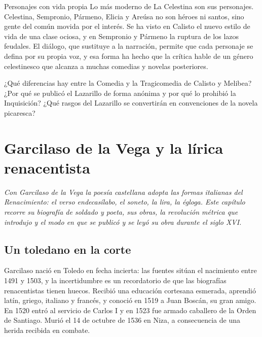\documentclass{book}
\begin{document}
\begin{tcolorbox}[title={Autoficha}, studiumcheck, breakable]

Personajes con vida propia
Lo más moderno de La Celestina son sus personajes. Celestina, Sempronio, Pármeno, Elicia y Areúsa no son héroes ni santos, sino gente del común movida por el interés. Se ha visto en Calisto el nuevo estilo de vida de una clase ociosa, y en Sempronio y Pármeno la ruptura de los lazos feudales. El diálogo, que sustituye a la narración, permite que cada personaje se defina por su propia voz, y esa forma ha hecho que la crítica hable de un género celestinesco que alcanza a muchas comedias y novelas posteriores.


¿Qué diferencias hay entre la Comedia y la Tragicomedia de Calisto y Melibea? ¿Por qué se publicó el Lazarillo de forma anónima y por qué lo prohibió la Inquisición? ¿Qué rasgos del Lazarillo se convertirán en convenciones de la novela picaresca?

\end{tcolorbox}

\chapter{Garcilaso de la Vega y la lírica renacentista}
\label{chap:lit-05}

\noindent\textit{Con Garcilaso de la Vega la poesía castellana adopta las formas italianas del Renacimiento: el verso endecasílabo, el soneto, la lira, la égloga. Este capítulo recorre su biografía de soldado y poeta, sus obras, la revolución métrica que introdujo y el modo en que se publicó y se leyó su obra durante el siglo XVI.}


\section{Un toledano en la corte}

Garcilaso nació en Toledo en fecha incierta: las fuentes sitúan el nacimiento entre 1491 y 1503, y la incertidumbre es un recordatorio de que las biografías renacentistas tienen huecos. Recibió una educación cortesana esmerada, aprendió latín, griego, italiano y francés, y conoció en 1519 a Juan Boscán, su gran amigo. En 1520 entró al servicio de Carlos I y en 1523 fue armado caballero de la Orden de Santiago. Murió el 14 de octubre de 1536 en Niza, a consecuencia de una herida recibida en combate.
\end{document}
